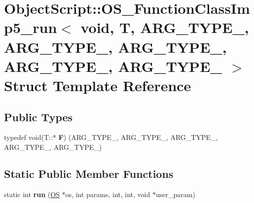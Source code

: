 \hypertarget{struct_object_script_1_1_o_s___function_class_imp5__run_3_01void_00_01_t_00_01_01_01_a_r_g___t_yeff8fee0f3943ceea453ce2a7a018387}{}\section{Object\+Script\+:\+:O\+S\+\_\+\+Function\+Class\+Imp5\+\_\+run$<$ void, T, A\+R\+G\+\_\+\+T\+Y\+P\+E\+\_, A\+R\+G\+\_\+\+T\+Y\+P\+E\+\_, A\+R\+G\+\_\+\+T\+Y\+P\+E\+\_, A\+R\+G\+\_\+\+T\+Y\+P\+E\+\_, A\+R\+G\+\_\+\+T\+Y\+P\+E\+\_ $>$ Struct Template Reference}
\label{struct_object_script_1_1_o_s___function_class_imp5__run_3_01void_00_01_t_00_01_01_01_a_r_g___t_yeff8fee0f3943ceea453ce2a7a018387}
\subsection*{Public Types}
\begin{DoxyCompactItemize}
\item 
typedef void(T\+::$\ast$ {\bfseries F}) (A\+R\+G\+\_\+\+T\+Y\+P\+E\+\_, A\+R\+G\+\_\+\+T\+Y\+P\+E\+\_, A\+R\+G\+\_\+\+T\+Y\+P\+E\+\_, A\+R\+G\+\_\+\+T\+Y\+P\+E\+\_, A\+R\+G\+\_\+\+T\+Y\+P\+E\+\_)\hypertarget{struct_object_script_1_1_o_s___function_class_imp5__run_3_01void_00_01_t_00_01_01_01_a_r_g___t_yeff8fee0f3943ceea453ce2a7a018387_a75eeace102daccdc7e828ed75f53b81a}{}\label{struct_object_script_1_1_o_s___function_class_imp5__run_3_01void_00_01_t_00_01_01_01_a_r_g___t_yeff8fee0f3943ceea453ce2a7a018387_a75eeace102daccdc7e828ed75f53b81a}

\end{DoxyCompactItemize}
\subsection*{Static Public Member Functions}
\begin{DoxyCompactItemize}
\item 
static int {\bfseries run} (\hyperlink{class_object_script_1_1_o_s}{OS} $\ast$os, int params, int, int, void $\ast$user\+\_\+param)\hypertarget{struct_object_script_1_1_o_s___function_class_imp5__run_3_01void_00_01_t_00_01_01_01_a_r_g___t_yeff8fee0f3943ceea453ce2a7a018387_af51407ccd0d47bf778f755e7907f23f5}{}\label{struct_object_script_1_1_o_s___function_class_imp5__run_3_01void_00_01_t_00_01_01_01_a_r_g___t_yeff8fee0f3943ceea453ce2a7a018387_af51407ccd0d47bf778f755e7907f23f5}

\end{DoxyCompactItemize}


